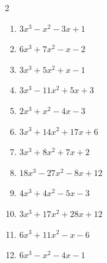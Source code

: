 


\setcounter{quesnum}{10}

\begin{multicols}{2}
\begin{enumerate}
  \itemsep=95pt
  \item $3x^{3}-x^{2}-3x+1$

        \phantom{$=(3x-1)(x+1)(x-1)$}

  \item $6x^{3}+7x^{2}-x-2$

        \phantom{$=(2x-1)(3x+2)(x+1)$}

  \item $3x^{3}+5x^{2}+x-1$


  \item $3x^{3}-11x^{2}+5x+3$

        \phantom{$=(3x+1)(x-1)(x-3)$}

  \item $2x^{3}+x^{2}-4x-3$


\columnbreak %

  \item $3x^{3}+14x^{2}+17x+6$

        \phantom{$=(3x+2)(x+1)(x+3)$}

  \item $3x^{3}+8x^{2}+7x+2$


  \item $18x^{3}-27x^{2}-8x+12$

        \phantom{$=(2x-3)(3x+2)(3x-2)$}

  \item $4x^{3}+4x^{2}-5x-3$

        \phantom{$=(2x+1)(2x+3)(x-1)$}

  \item $3x^{3}+17x^{2}+28x+12$

        \phantom{$=(3x+2)(x+2)(x+3)$}

\columnbreak %

\resetques

  \item $6x^{3}+11x^{2}-x-6$

        \phantom{$=(2x+3)(3x-2)(x+1)$}

  \item $6x^{3}-x^{2}-4x-1$


\end{enumerate}
\end{multicols}
